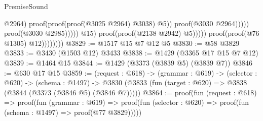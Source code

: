 \begin{lexlean}{PremiseSound}
\begin{coremodule}
                                                          @2964)
                                                        proof(proof(proof(@3025 @2964) @3038) @5))
                                                      proof(@3030 @2964)))))
                                            proof(@3030 @2985)))))
                              @15)
                            proof(proof(@2138 @2942) @5)))))
                  proof(proof(@76 @1305) @12))))))))
@3829 := @1517 @15 @7 @12 @5
@3830 := @58 @3829
@3833 := @3430 (@1503 @12) @3433
@3838 := @1429 (@3365 @17 @15 @7 @12)
@3839 := @1464 @15
@3844 := @1429 (@3373 (@3839 @5) (@3839 @7))
@3846 := @630 @17 @15
@3859 := (request : @618) ->
  (grammar : @619) ->
  (selector : @620) ->
  (schema : @1497) ->
  @3830 (@3833 (fun (target : @620) => @3838 (@3844 (@3373 (@3846 @5) (@3846 @7)))))
@3864 := proof(fun (request : @618) =>
    proof(fun (grammar : @619) =>
      proof(fun (selector : @620) => proof(fun (schema : @1497) => proof(@77 @3829)))))
\end{coremodule}
\end{lexlean}
